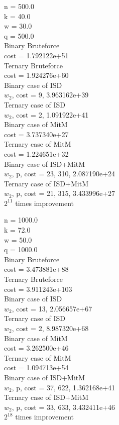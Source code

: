 \documentclass[12pt]{article}
\begin{document}
n = 500.0 \\
k = 40.0 \\
w = 30.0 \\
q = 500.0 \\
Binary Bruteforce \\
cost = 1.792122e+51 \\
Ternary Bruteforce \\
cost = 1.924276e+60 \\
Binary case of ISD \\
$w_2$, cost = 9, 3.963162e+39 \\
Ternary case of ISD \\
$w_2$, cost = 2, 1.091922e+41 \\
Binary case of MitM \\
cost = 3.737340e+27 \\
Ternary case of MitM \\
cost = 1.224651e+32 \\
Binary case of ISD+MitM \\
$w_2$, p, cost = 23, 310, 2.087190e+24 \\
Ternary case of ISD+MitM \\
$w_2$, p, cost = 21, 315, 3.433996e+27 \\
$2^{11}$ times improvement



n = 1000.0 \\
k = 72.0 \\
w = 50.0 \\
q = 1000.0 \\
Binary Bruteforce \\
cost = 3.473881e+88 \\
Ternary Bruteforce \\
cost = 3.911243e+103 \\
Binary case of ISD \\
$w_2$, cost = 13, 2.056657e+67 \\
Ternary case of ISD \\
$w_2$, cost = 2, 8.987320e+68 \\
Binary case of MitM \\
cost = 3.262500e+46 \\
Ternary case of MitM \\
cost = 1.094713e+54 \\
Binary case of ISD+MitM \\
$w_2$, p, cost = 37, 622, 1.362168e+41 \\
Ternary case of ISD+MitM \\
$w_2$, p, cost = 33, 633, 3.432411e+46 \\
$2^{18}$ times improvement
\end{document}
